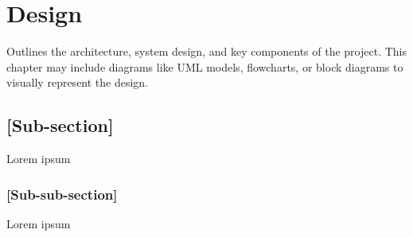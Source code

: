 \chapter{Design} 
Outlines the architecture, system design, and key components of the project. This chapter may include diagrams like UML models, flowcharts, or block diagrams to visually represent the design. 

\section{[Sub-section]} Lorem ipsum 
\subsection{[Sub-sub-section]} Lorem ipsum